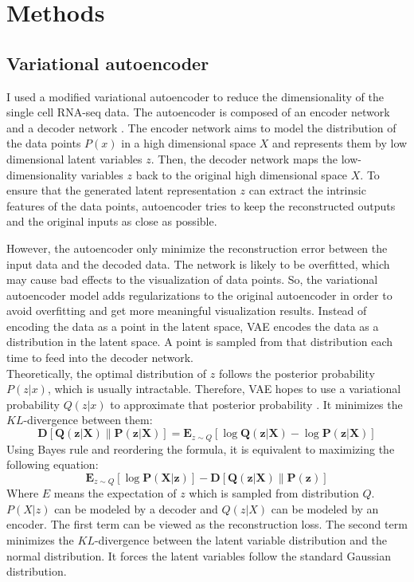\section{Methods}
\subsection{Variational autoencoder}
I used a modified variational autoencoder \cite{Kingma2014} to reduce the dimensionality of the single cell RNA-seq data. The autoencoder is composed of an encoder network and a decoder network \cite{wang2016auto}. The encoder network aims to model the distribution of the data points $P(x)$ in a high dimensional space $X$ and represents them by low dimensional latent variables $z$. Then, the decoder network maps the low-dimensionality variables $z$ back to the original high dimensional space $X$. To ensure that the generated latent representation $z$ can extract the intrinsic features of the data points, autoencoder tries to keep the reconstructed outputs and the original inputs as close as possible. 

However, the autoencoder only minimize the reconstruction error between the input data and the decoded data. The network is likely to be overfitted, which may cause bad effects to the visualization of data points. So, the variational autoencoder model adds regularizations to the original autoencoder in order to avoid overfitting and get more meaningful visualization results. Instead of encoding the data as a point in the latent space, VAE encodes the data as a distribution in the latent space. A point is sampled from that distribution each time to feed into the decoder network. \\
Theoretically, the optimal distribution of $z$ follows the posterior probability $P(z|x)$, which is usually intractable. Therefore, VAE hopes to use a variational probability $Q(z|x)$ to approximate that posterior probability \cite{doersch2016tutorial}. It minimizes the $KL$-divergence between them:
\begin{equation}
\boldsymbol{D}[\boldsymbol{Q}(\boldsymbol{z} | \boldsymbol{X}) \| \boldsymbol{P}(\boldsymbol{z} | \boldsymbol{X})]=\mathbf{E}_{z \sim Q}[\log \boldsymbol{Q}(\boldsymbol{z} | \boldsymbol{X})-\log \boldsymbol{P}(\boldsymbol{z} | \boldsymbol{X})]
\end{equation}
Using Bayes rule and reordering the formula, it is equivalent to maximizing the following equation:
\begin{equation}
\mathbf{E}_{z \sim Q}[\log \boldsymbol{P}(\boldsymbol{X} | \boldsymbol{z})]-\boldsymbol{D}[\boldsymbol{Q}(\boldsymbol{z} | \boldsymbol{X}) \| \boldsymbol{P}(\boldsymbol{z})]
\end{equation}
Where $E$ means the expectation of $z$ which is sampled from distribution $Q$. $P(X|z)$ can be modeled by a decoder and $Q(z|X)$ can be modeled by an encoder. The first term can be viewed as the reconstruction loss. The second term minimizes the $KL$-divergence between the latent variable distribution and the normal distribution. It forces the latent variables follow the standard Gaussian distribution.
